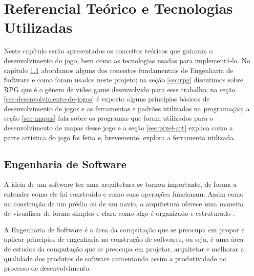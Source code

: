 \chapter{Referencial Teórico e Tecnologias Utilizadas}
\label{sec-referencial}
Neste capítulo serão apresentados os conceitos teóricos que guiaram o desenvolvimento do jogo, bem como as tecnologias usadas para implementá-lo. No capítulo \ref{sec:engenharia-de-software} abordamos alguns dos conceitos fundamentais de Engenharia de Software e como foram usados neste projeto;  na seção \ref{sec:rpg}  discutimos sobre RPG que é o gênero de video game desenvolvido para esse trabalho; na seção \ref{sec-desenvolvimento-de-jogos} é exposto alguns princípios básicos de desenvolvimento de jogos e as ferramentas e padrões utilizados na programação; a seção \ref{sec-mapas} fala sobre os programas que foram utilizados para o desenvolvimento de mapas desse jogo e a seção \ref{sec:pixel-art} explica como a parte artística do jogo foi feita e, brevemente, explora a ferramenta utilizada.

\section{Engenharia de Software}
\label{sec:engenharia-de-software}
A ideia de um software ter uma arquitetura se tornou importante, de forma a entender como ele foi construído e como suas operações funcionam. Assim como na construção de um prédio ou de um navio, a arquitetura oferece uma maneira de visualizar de forma simples e clara como algo é organizado e estruturado \cite{budgen2020software}. 

A Engenharia de Software é a área da computação que se preocupa em propor e aplicar princípios de engenharia na construção de softwares\cite{engsoftmoderna}, ou seja, é uma área de estudos da computação que se preocupa em projetar, arquitetar e melhorar a qualidade dos produtos de software aumentando assim a produtividade no processo de desenvolvimento. 

